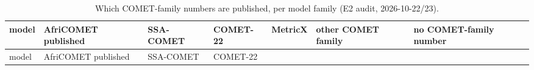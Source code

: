 {\footnotesize\setlength{\tabcolsep}{3pt}
\begin{longtable}[]{@{}
  >{\raggedright\arraybackslash}p{}
  >{\raggedright\arraybackslash}p{}
  >{\raggedright\arraybackslash}p{}
  >{\raggedright\arraybackslash}p{}
  >{\raggedright\arraybackslash}p{}
  >{\raggedright\arraybackslash}p{}
  >{\raggedright\arraybackslash}p{}@{}}
\caption{Which COMET-family numbers are published, per model family (E2 audit, 2026-10-22/23).}\label{tab:t_model_comparison_comet_audit}\tabularnewline
\toprule\noalign{}
\begin{minipage}[b]{\linewidth}\raggedright
model
\end{minipage} & \begin{minipage}[b]{\linewidth}\raggedright
AfriCOMET published
\end{minipage} & \begin{minipage}[b]{\linewidth}\raggedright
SSA-COMET
\end{minipage} & \begin{minipage}[b]{\linewidth}\raggedright
COMET-22
\end{minipage} & \begin{minipage}[b]{\linewidth}\raggedright
MetricX
\end{minipage} & \begin{minipage}[b]{\linewidth}\raggedright
other COMET family
\end{minipage} & \begin{minipage}[b]{\linewidth}\raggedright
no COMET-family number
\end{minipage} \\
\midrule\noalign{}
\endfirsthead
\toprule\noalign{}
\begin{minipage}[b]{\linewidth}\raggedright
model
\end{minipage} & \begin{minipage}[b]{\linewidth}\raggedright
AfriCOMET published
\end{minipage} & \begin{minipage}[b]{\linewidth}\raggedright
SSA-COMET
\end{minipage} & \begin{minipage}[b]{\linewidth}\raggedright
COMET-22
\end{minipage} & \begin{minipage}[b]{\linewidth}\raggedright

\end{minipage}
\end{longtable}}
